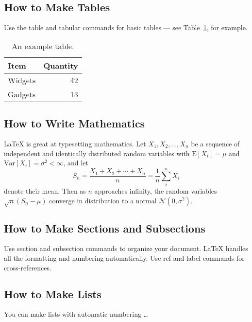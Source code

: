\documentclass[a4paper]{article}
\begin{document}
\subsection{How to Make Tables}

Use the table and tabular commands for basic tables --- see Table~\ref{tab:widgets}, for example.

\begin{table}
\centering
\begin{tabular}{l|r}
Item & Quantity \\\hline
Widgets & 42 \\
          Gadgets & 13
          \end{tabular}
          \caption{\label{tab:widgets}An example table.}
          \end{table}

          \subsection{How to Write Mathematics}

          \LaTeX{} is great at typesetting mathematics. Let $X_1, X_2, \ldots, X_n$ be a sequence of independent and identically distributed random variables with $\text{E}[X_i] = \mu$ and $\text{Var}[X_i] = \sigma^2 < \infty$, and let
          $$S_n = \frac{X_1 + X_2 + \cdots + X_n}{n}
          = \frac{1}{n}\sum_{i}^{n} X_i$$
          denote their mean. Then as $n$ approaches infinity, the random variables $\sqrt{n}(S_n - \mu)$ converge in distribution to a normal $\mathcal{N}(0, \sigma^2)$.

          \subsection{How to Make Sections and Subsections}

          Use section and subsection commands to organize your document. \LaTeX{} handles all the formatting and numbering automatically. Use ref and label commands for cross-references.

          \subsection{How to Make Lists}

          You can make lists with automatic numbering \dots
\end{document}
